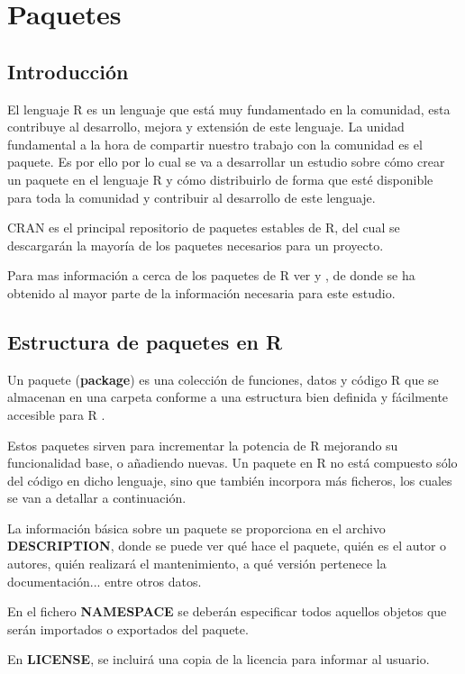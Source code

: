 \section{Paquetes}
\subsection{Introducci\'on}


El lenguaje R es un lenguaje que est\'a muy fundamentado en la comunidad, esta contribuye al desarrollo, mejora y extensi\'on de este lenguaje. La unidad fundamental a la hora de compartir 
nuestro trabajo con la comunidad es el paquete. Es por ello por lo cual se va a desarrollar un estudio sobre c\'omo crear un paquete en el lenguaje R y c\'omo distribuirlo de forma que est\'e disponible para toda la comunidad y contribuir al desarrollo de este lenguaje.

CRAN es el principal repositorio de paquetes estables de R, del cual se descargar\'an la mayor\'ia de los paquetes necesarios para un proyecto.

Para mas informaci\'on a cerca de los paquetes de R ver \cite{rcore} y \cite{book}, de donde se ha obtenido al mayor parte de la informaci\'on necesaria para este estudio.
\subsection{Estructura de paquetes en R}

Un paquete (\textbf{package}) es una colecci\'on de funciones, datos y c\'odigo R que se almacenan en una carpeta 
conforme a una estructura bien definida y f\'acilmente accesible para R \cite{librR}.

Estos paquetes sirven para incrementar la potencia de R mejorando su funcionalidad base, o a\~nadiendo 
nuevas.
Un paquete en R no est\'a compuesto s\'olo del c\'odigo en dicho lenguaje, sino que tambi\'en incorpora m\'as ficheros, 
los cuales se van a detallar a continuaci\'on.\cite{rParaTodos}

La informaci\'on b\'asica sobre un paquete se proporciona en el archivo \textbf{DESCRIPTION}, donde se puede ver qu\'e hace 
el paquete, qui\'en es el autor o autores, qui\'en realizar\'a el mantenimiento, a qu\'e versi\'on pertenece la documentaci\'on... entre otros datos.

En el fichero \textbf{NAMESPACE} se deber\'an especificar todos aquellos objetos que ser\'an importados o exportados del paquete.

En \textbf{LICENSE}, se incluir\'a una copia de la licencia para informar al usuario.

